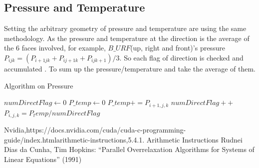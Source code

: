 \documentclass{article}%
\begin{document}
\subsection{Pressure and Temperature}
Setting the arbitrary geometry of pressure and temperature are using the same methodology. As the pressure and temperature at the direction is the average of the 6 faces involved, for example, $B\_URF$(up, right and front)’s pressure $P_{ijk} = (P_{i+1jk} + P_{ij+1k} + P_{ijk+1})/3$. So each flag of direction is checked and accumulated .  To sum up the pressure/temperature and take the average of them. 

\begin{algorithm}
\caption{Algorithm on Pressure}\label{euclid}
\begin{algorithmic}
	\State $numDirectFlag\gets 0$
	\State $P\_temp\gets 0$
    		\State $P\_temp += P_{i+1,j,k}$
    		\State $numDirectFlag++$
    	\EndIf
    \State $P_{i,j,k}= P_temp / numDirectFlag$
\EndIf
\EndFor
\end{algorithmic}
\end{algorithm}



\begin{thebibliography}{999}

Nvidia,https://docs.nvidia.com/cuda/cuda-c-programming-guide/index.html\text{\#}arithmetic-instructions,5.4.1. Arithmetic Instructions
Rudnei Dias da Cunha, Tim Hopkins: “Parallel Overrelaxation Algorithms for Systems of Linear Equations” (1991)
\end{thebibliography}
\end{document}
